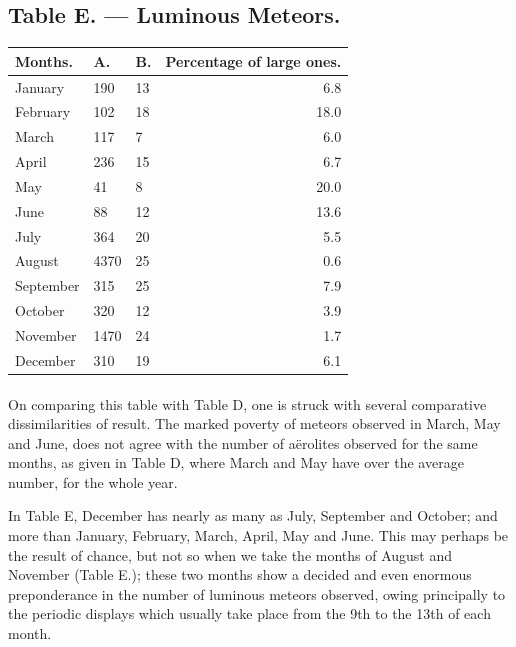 \documentclass[a4paper, 12pt, oneside]{article}
\begin{document}
\subsection{Table E. --- Luminous Meteors.}
\begin{table}[H]
    \centering
    \bfseries
    \Fontauri
    \begin{tabular}{|l|l|l|r|}
    \hline
         Months. & A. & B. & Percentage of large ones. \\ \hline
        January & 190 & 13 & 6.8 \\ \hline
        February & 102 & 18 & 18.0 \\ \hline
        March & 117 & 7 & 6.0 \\ \hline
        April & 236 & 15 & 6.7 \\ \hline
        May & 41 & 8 & 20.0 \\ \hline
        June & 88 & 12 & 13.6 \\ \hline
        July & 364 & 20 & 5.5 \\ \hline
        August & 4370 & 25 & 0.6 \\ \hline
        September & 315 & 25 & 7.9 \\ \hline
        October & 320 & 12 & 3.9 \\ \hline
        November & 1470 & 24 & 1.7 \\ \hline
        December & 310 & 19 & 6.1 \\ \hline
    \end{tabular}
\end{table}
\paragraph{}
On comparing this table with Table D, one is struck with several comparative dissimilarities of result. The marked poverty of meteors observed in March, May and June, does not agree with the number of aërolites observed for the same months, as given in Table D, where March and May have over the average number, for the whole year.

In Table E, December has nearly as many as July, September and October; and more than January, February, March, April, May and June. This may perhaps be the result of chance, but not so when we take the months of August and November (Table E.); these two months show a decided and even enormous preponderance in the number of luminous meteors observed, owing principally to the periodic displays which usually take place from the 9th to the 13th of each month.
\end{document}
